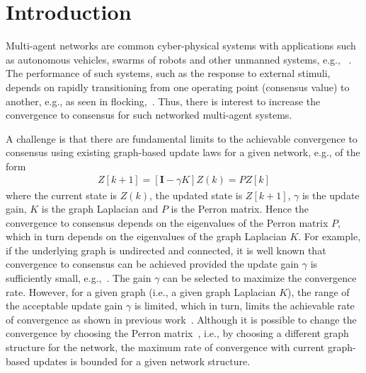 \documentclass[conference]{IEEEtran}
\begin{document}
\section{Introduction}
\vspace{-0.01in}
Multi-agent networks are common cyber-physical systems with applications such as
autonomous vehicles, swarms of robots and other unmanned systems, e.g., ~\cite{Huth_92,Vicsek_95,Jadbabaie_03,Ren_Beard_05,Olfati_Saber_06,Karafyllis_15,Peng_IJC_16,Meng_IJC_17}. 
The performance of such systems, such as the response to external stimuli, depends on 
rapidly transitioning from one operating point (consensus value) to another, e.g., as seen in flocking,~\cite{Attanasi_14,Wang_IJC_15}. Thus, there is interest to increase the convergence 
to consensus for such networked multi-agent systems. 

\vspace{0.1in}
A challenge is that there are fundamental limits to the achievable convergence to consensus using existing graph-based update laws 
for a given network, e.g., of the form 
\begin{align}
Z[k+1]   =   \left[  {\textbf{I}} -\gamma K \right] Z(k)  = P Z[k]
\label{EQ_intro_standard}
\end{align}
where the 
current state is $Z(k)$, the updated state is $Z[k+1]$,  $\gamma$ is the update gain, $K$ is the graph Laplacian and $P$ is the Perron matrix. Hence the 
convergence to consensus depends on the  
eigenvalues of the Perron matrix $P$, which in turn depends on the 
eigenvalues of the graph Laplacian $K$. 
%
For example, if the underlying graph  is undirected and connected, it is well known that convergence to consensus can be achieved provided the update gain $\gamma$ is  
sufficiently small, e.g.,~\cite{Olfati_Murray_07}. 
The gain $\gamma$ can be selected to maximize the convergence rate. 
However, for a given graph  (i.e., a given graph Laplacian $K$), the range of the acceptable update gain $\gamma$ 
is limited, which in turn, limits the achievable rate of convergence as shown in previous work~\cite{Devasia_2019_ICC}. 
Although  it is possible to change the convergence by choosing the Perron matrix~\cite{Chen_Weisheng_14}, i.e., by choosing a different graph structure for the network, the maximum rate of convergence with current 
graph-based updates is bounded for a given network structure. 
\end{document}
